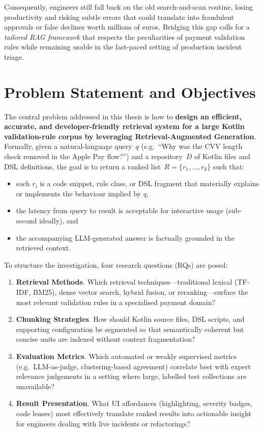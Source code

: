 Consequently, engineers still fall back on the old search-and-scan routine, losing productivity and risking subtle errors that could translate into fraudulent approvals or false declines worth millions of euros.  
Bridging this gap calls for a \emph{tailored RAG framework} that respects the peculiarities of payment validation rules while remaining usable in the fast-paced setting of production incident triage.

\section{Problem Statement and Objectives}
\label{sec:problem-statement}

The central problem addressed in this thesis is how to \textbf{design an efficient, accurate, and developer-friendly retrieval system for a large Kotlin validation-rule corpus by leveraging Retrieval-Augmented Generation}.  
Formally, given a natural-language query~$q$ (e.g.\ “Why was the CVV length check removed in the Apple Pay flow?”) and a repository~$D$ of Kotlin files and DSL definitions, the goal is to return a ranked list~$R = \{r_1, \dots, r_k\}$ such that:

\begin{itemize}
    \item each $r_i$ is a code snippet, rule class, or DSL fragment that materially explains or implements the behaviour implied by $q$,
    \item the latency from query to result is acceptable for interactive usage (sub-second ideally), and
    \item the accompanying LLM-generated answer is factually grounded in the retrieved context.
\end{itemize}

To structure the investigation, four research questions (RQs) are posed:

\begin{enumerate}[label=\textbf{RQ\arabic*:}, leftmargin=2.5em]
    \item \textbf{Retrieval Methods}. Which retrieval techniques—traditional lexical (TF-IDF, BM25), dense vector search, hybrid fusion, or reranking—surface the most relevant validation rules in a specialised payment domain?
    \item \textbf{Chunking Strategies}. How should Kotlin source files, DSL scripts, and supporting configuration be segmented so that semantically coherent but concise units are indexed without context fragmentation?
    \item \textbf{Evaluation Metrics}. Which automated or weakly supervised metrics (e.g.\ LLM-as-judge, clustering-based agreement) correlate best with expert relevance judgements in a setting where large, labelled test collections are unavailable?
    \item \textbf{Result Presentation}. What UI affordances (highlighting, severity badges, code lenses) most effectively translate ranked results into actionable insight for engineers dealing with live incidents or refactorings?
\end{enumerate}

